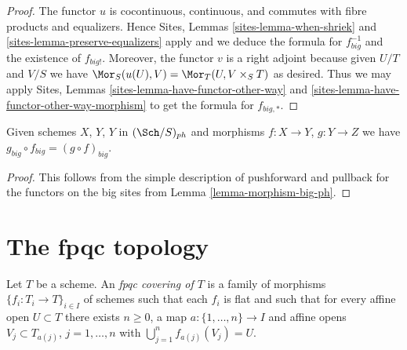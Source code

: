 \begin{proof}
The functor $u$ is cocontinuous, continuous, and commutes with fibre products
and equalizers. Hence
Sites, Lemmas \ref{sites-lemma-when-shriek} and
\ref{sites-lemma-preserve-equalizers}
apply and we deduce the formula
for $f_{big}^{-1}$ and the existence of $f_{big!}$. Moreover,
the functor $v$ is a right adjoint because given $U/T$ and $V/S$
we have $\Mor_S(u(U), V) = \Mor_T(U, V \times_S T)$
as desired. Thus we may apply
Sites, Lemmas \ref{sites-lemma-have-functor-other-way} and
\ref{sites-lemma-have-functor-other-way-morphism} to get the
formula for $f_{big, *}$.
\end{proof}

\begin{lemma}
\label{lemma-composition-ph}
Given schemes $X$, $Y$, $Y$ in $(\Sch/S)_{ph}$
and morphisms $f : X \to Y$, $g : Y \to Z$ we have
$g_{big} \circ f_{big} = (g \circ f)_{big}$.
\end{lemma}

\begin{proof}
This follows from the simple description of pushforward
and pullback for the functors on the big sites from
Lemma \ref{lemma-morphism-big-ph}.
\end{proof}



































\section{The fpqc topology}
\label{section-fpqc}

\begin{definition}
\label{definition-fpqc-covering}
Let $T$ be a scheme. An {\it fpqc covering of $T$} is a family
of morphisms $\{f_i : T_i \to T\}_{i \in I}$ of schemes
such that each $f_i$ is flat and such that for every affine open
$U \subset T$ there exists $n \geq 0$, a map
$a : \{1, \ldots, n\} \to I$ and affine opens
$V_j \subset T_{a(j)}$, $j = 1, \ldots, n$
with $\bigcup_{j = 1}^n f_{a(j)}(V_j) = U$.
\end{definition}

